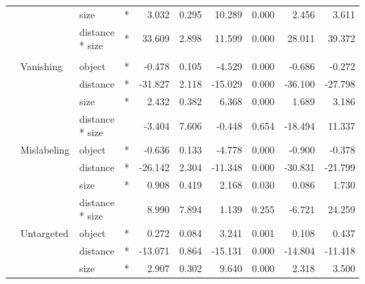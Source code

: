 \documentclass[
]{article}
\begin{document}
\begin{longtable}[t]{llllrrrrrr}
\cmidrule{3-10}\nopagebreak
\hspace{1em} &  & size & * & 3.032 & 0.295 & 10.289 & 0.000 & 2.456 & 3.611\\
\cmidrule{3-10}\nopagebreak
\hspace{1em} &  & distance * size & * & 33.609 & 2.898 & 11.599 & 0.000 & 28.011 & 39.372\\
\cmidrule{1-10}\pagebreak[0]
\addlinespace[0.3em]
\multicolumn{10}{l}{\textbf{Faster R-CNN}}\\
\hspace{1em} & Vanishing & object & * & -0.478 & 0.105 & -4.529 & 0.000 & -0.686 & -0.272\\
\cmidrule{3-10}\nopagebreak
\hspace{1em} &  & distance & * & -31.827 & 2.118 & -15.029 & 0.000 & -36.100 & -27.798\\
\cmidrule{3-10}\nopagebreak
\hspace{1em} &  & size & * & 2.432 & 0.382 & 6.368 & 0.000 & 1.689 & 3.186\\
\cmidrule{3-10}\nopagebreak
\hspace{1em} &  & distance * size &  & -3.404 & 7.606 & -0.448 & 0.654 & -18.494 & 11.337\\
\cmidrule{2-10}\nopagebreak
\hspace{1em} & Mislabeling & object & * & -0.636 & 0.133 & -4.778 & 0.000 & -0.900 & -0.378\\
\cmidrule{3-10}\nopagebreak
\hspace{1em} &  & distance & * & -26.142 & 2.304 & -11.348 & 0.000 & -30.831 & -21.799\\
\cmidrule{3-10}\nopagebreak
\hspace{1em} &  & size & * & 0.908 & 0.419 & 2.168 & 0.030 & 0.086 & 1.730\\
\cmidrule{3-10}\nopagebreak
\hspace{1em} &  & distance * size &  & 8.990 & 7.894 & 1.139 & 0.255 & -6.721 & 24.259\\
\cmidrule{2-10}\nopagebreak
\hspace{1em} & Untargeted & object & * & 0.272 & 0.084 & 3.241 & 0.001 & 0.108 & 0.437\\
\cmidrule{3-10}\nopagebreak
\hspace{1em} &  & distance & * & -13.071 & 0.864 & -15.131 & 0.000 & -14.804 & -11.418\\
\cmidrule{3-10}\nopagebreak
\hspace{1em} &  & size & * & 2.907 & 0.302 & 9.640 & 0.000 & 2.318 & 3.500\\

\end{longtable}
\end{document}

